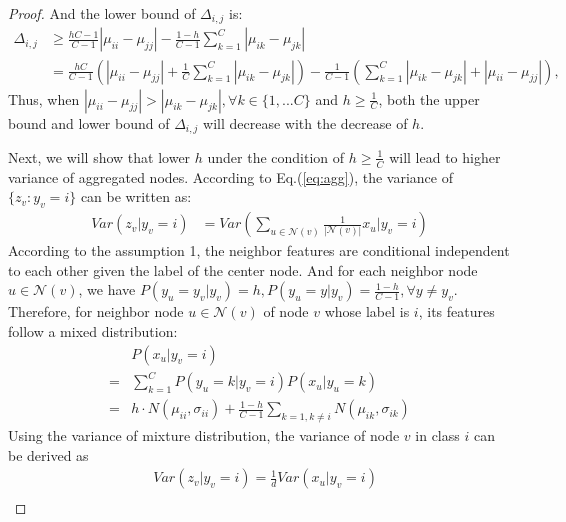 \begin{proof}
And the lower bound of $\Delta_{i,j}$ is:
\begin{equation}
\begin{aligned}
    \Delta_{i,j} & \geq \frac{hC-1}{C-1} |\mu_{ii}-\mu_{jj}|-\frac{1-h}{C-1}\sum_{k=1}^C|\mu_{ik}-\mu_{jk}| \\
    & = \frac{hC}{C-1}(|\mu_{ii} - \mu_{jj}|+\frac{1}{C}\sum_{k=1}^C|\mu_{ik}-\mu_{jk}|) -\frac{1}{C-1}(\sum_{k=1}^C|\mu_{ik} - \mu_{jk}| + |\mu_{ii} - \mu_{jj}|),
\end{aligned}
\label{eq:differ}
\end{equation}
Thus, when $|\mu_{ii}-\mu_{jj}|>|\mu_{ik} - \mu_{jk}|, \forall k \in \{1,...C\}$ and $h\geq \frac{1}{C}$,  both the upper bound and lower bound of $\Delta_{i,j}$ will decrease with the decrease of $h$.

Next, we will show that lower $h$ under the condition of $h \geq \frac{1}{C}$ will lead to higher variance of aggregated nodes. According to Eq.(\ref{eq:agg}), the variance of $\{{z}_{v}: y_v=i\}$ can be written as:
\begin{equation}
\begin{aligned}
    Var({z}_{v}|y_v=i) & = Var(\sum_{u\in \mathcal{N}(v)}\frac{1}{|\mathcal{N}(v)|}{x}_u | y_v=i) \nonumber
\end{aligned}
\label{eq:var_init}
\end{equation}
According to the assumption 1, the neighbor features are conditional independent to each other given the label of the center node. And for each neighbor node $u \in \mathcal{N}(v)$, we have $P(y_u =
y_v|y_v) = h, P(y_u = y|y_v) = \frac{1-h}{C-1}, \forall y \ne y_v$.
Therefore, for neighbor node $u \in \mathcal{N}(v)$ of node $v$ whose label is $i$, its features follow a mixed distribution:
\begin{equation}
\begin{aligned}
        & P({x}_u|y_v=i) \\
        = & \sum_{k=1}^C P(y_u=k|y_v=i) P({x}_u|y_u=k)\\
        = & h \cdot N(\mu_{ii},\sigma_{ii}) + \frac{1-h}{C-1} \sum_{k=1,k\neq i} N(\mu_{ik}, \sigma_{ik})
\end{aligned}
\end{equation}
Using the variance of mixture distribution, the variance of node $v$ in class $i$ can be derived as
\begin{equation}
    \begin{aligned}
        &Var({z}_{v}|y_v=i) 
        =  \frac{1}{d}  Var({x}_u | y_v=i) \\

\end{aligned}
\end{equation}
\end{proof}
